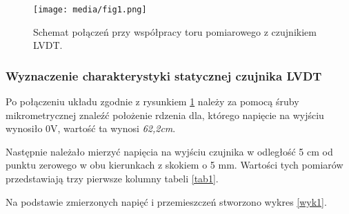 \documentclass{article}
\begin{document}
\vspace{1em}
\begin{figure}[ht]
    \centering
    \texttt{[image: media/fig1.png]}
    \caption{Schemat połączeń przy współpracy toru pomiarowego z czujnikiem LVDT.}
    \label{fig1}
\end{figure}
\newpage

\subsubsection{Wyznaczenie charakterystyki statycznej czujnika LVDT} \label{1a}
Po połączeniu układu zgodnie z rysunkiem \ref{fig1} należy za pomocą śruby mikrometrycznej znaleźć położenie rdzenia dla, którego napięcie na wyjściu wynosiło 0V, wartość ta wynosi \textit{62,2cm}. 



Następnie należało mierzyć napięcia na wyjściu czujnika w odległość 5 cm od punktu zerowego w obu kierunkach z skokiem o 5 mm. Wartości tych pomiarów przedstawiają trzy pierwsze kolumny tabeli \ref{tab1}.

Na podstawie zmierzonych napięć i przemieszczeń stworzono wykres \ref{wyk1}.
\end{document}
